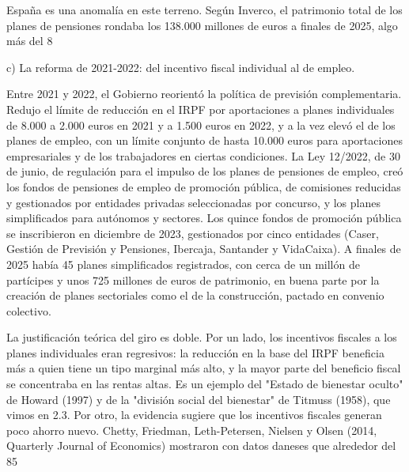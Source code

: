 \documentclass[10pt,a4paper]{article}
\begin{document}
España es una anomalía en este terreno. Según Inverco, el patrimonio total de los planes de pensiones rondaba los 138.000 millones de euros a finales de 2025, algo más del 8%

c) La reforma de 2021-2022: del incentivo fiscal individual al de empleo.

Entre 2021 y 2022, el Gobierno reorientó la política de previsión complementaria. Redujo el límite de reducción en el IRPF por aportaciones a planes individuales de 8.000 a 2.000 euros en 2021 y a 1.500 euros en 2022, y a la vez elevó el de los planes de empleo, con un límite conjunto de hasta 10.000 euros para aportaciones empresariales y de los trabajadores en ciertas condiciones. La Ley 12/2022, de 30 de junio, de regulación para el impulso de los planes de pensiones de empleo, creó los fondos de pensiones de empleo de promoción pública, de comisiones reducidas y gestionados por entidades privadas seleccionadas por concurso, y los planes simplificados para autónomos y sectores. Los quince fondos de promoción pública se inscribieron en diciembre de 2023, gestionados por cinco entidades (Caser, Gestión de Previsión y Pensiones, Ibercaja, Santander y VidaCaixa). A finales de 2025 había 45 planes simplificados registrados, con cerca de un millón de partícipes y unos 725 millones de euros de patrimonio, en buena parte por la creación de planes sectoriales como el de la construcción, pactado en convenio colectivo.

La justificación teórica del giro es doble. Por un lado, los incentivos fiscales a los planes individuales eran regresivos: la reducción en la base del IRPF beneficia más a quien tiene un tipo marginal más alto, y la mayor parte del beneficio fiscal se concentraba en las rentas altas. Es un ejemplo del "Estado de bienestar oculto" de Howard (1997) y de la "división social del bienestar" de Titmuss (1958), que vimos en 2.3. Por otro, la evidencia sugiere que los incentivos fiscales generan poco ahorro nuevo. Chetty, Friedman, Leth-Petersen, Nielsen y Olsen (2014, Quarterly Journal of Economics) mostraron con datos daneses que alrededor del 85%
\end{document}
